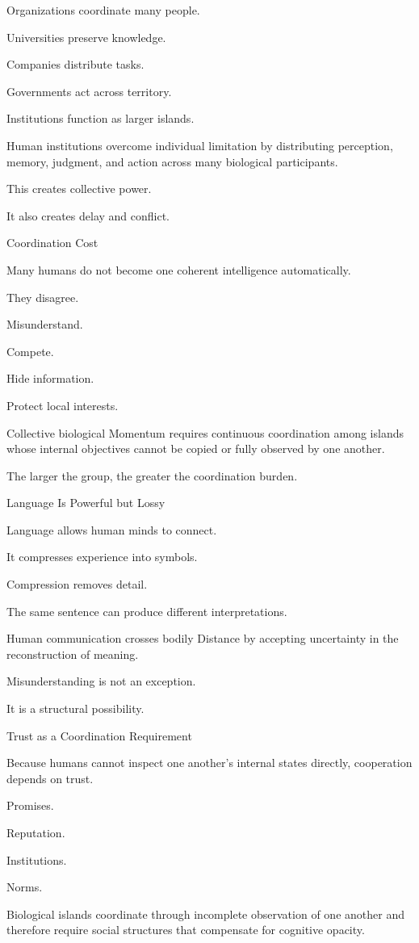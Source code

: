 Organizations coordinate many people.

Universities preserve knowledge.

Companies distribute tasks.

Governments act across territory.

Institutions function as larger islands.

Human institutions overcome individual limitation by distributing perception, memory, judgment, and action across many biological participants.

This creates collective power.

It also creates delay and conflict.

Coordination Cost

Many humans do not become one coherent intelligence automatically.

They disagree.

Misunderstand.

Compete.

Hide information.

Protect local interests.

Collective biological Momentum requires continuous coordination among islands whose internal objectives cannot be copied or fully observed by one another.

The larger the group, the greater the coordination burden.

Language Is Powerful but Lossy

Language allows human minds to connect.

It compresses experience into symbols.

Compression removes detail.

The same sentence can produce different interpretations.

Human communication crosses bodily Distance by accepting uncertainty in the reconstruction of meaning.

Misunderstanding is not an exception.

It is a structural possibility.

Trust as a Coordination Requirement

Because humans cannot inspect one another’s internal states directly, cooperation depends on trust.

Promises.

Reputation.

Institutions.

Norms.

Biological islands coordinate through incomplete observation of one another and therefore require social structures that compensate for cognitive opacity.

